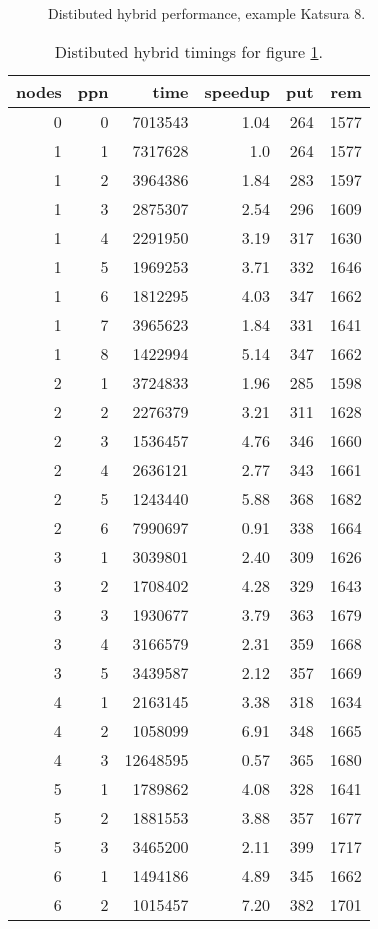 \documentclass[10pt,twocolumn,a4paper]{article}
\begin{document}
\begin{figure}[thb]
\centering
{}
\caption{Distibuted hybrid performance, example Katsura 8.}
\label{fig:k8hyb1}
\end{figure}

\begin{table}[thb]
\centering
\caption{Distibuted hybrid timings for figure \ref{fig:k8hyb1}.}
\label{fig:k8hyb1t}
\small{
\clearpage{}
\begin{tabular}{|r|r|r|r|r|r|}
\hline
 nodes & ppn & time & speedup & put & rem 
\\ \hline
 0 & 0 & 7013543 & 1.04 & 264 & 1577
\\ \hline
 1 & 1 & 7317628 & 1.0 & 264 & 1577
\\ \hline
 1 & 2 & 3964386 & 1.84 & 283 & 1597
\\ \hline
 1 & 3 & 2875307 & 2.54 & 296 & 1609
\\ \hline
 1 & 4 & 2291950 & 3.19 & 317 & 1630
\\ \hline
 1 & 5 & 1969253 & 3.71 & 332 & 1646
\\ \hline
 1 & 6 & 1812295 & 4.03 & 347 & 1662
\\ \hline
 1 & 7 & 3965623 & 1.84 & 331 & 1641
\\ \hline
 1 & 8 & 1422994 & 5.14 & 347 & 1662
\\ \hline
 2 & 1 & 3724833 & 1.96 & 285 & 1598
\\ \hline
 2 & 2 & 2276379 & 3.21 & 311 & 1628
\\ \hline
 2 & 3 & 1536457 & 4.76 & 346 & 1660
\\ \hline
 2 & 4 & 2636121 & 2.77 & 343 & 1661
\\ \hline
 2 & 5 & 1243440 & 5.88 & 368 & 1682
\\ \hline
 2 & 6 & 7990697 & 0.91 & 338 & 1664
\\ \hline
 3 & 1 & 3039801 & 2.40 & 309 & 1626
\\ \hline
 3 & 2 & 1708402 & 4.28 & 329 & 1643
\\ \hline
 3 & 3 & 1930677 & 3.79 & 363 & 1679
\\ \hline
 3 & 4 & 3166579 & 2.31 & 359 & 1668
\\ \hline
 3 & 5 & 3439587 & 2.12 & 357 & 1669
\\ \hline
 4 & 1 & 2163145 & 3.38 & 318 & 1634
\\ \hline
 4 & 2 & 1058099 & 6.91 & 348 & 1665
\\ \hline
 4 & 3 & 12648595 & 0.57 & 365 & 1680
\\ \hline
 5 & 1 & 1789862 & 4.08 & 328 & 1641
\\ \hline
 5 & 2 & 1881553 & 3.88 & 357 & 1677
\\ \hline
 5 & 3 & 3465200 & 2.11 & 399 & 1717
\\ \hline
 6 & 1 & 1494186 & 4.89 & 345 & 1662
\\ \hline
 6 & 2 & 1015457 & 7.20 & 382 & 1701
\\ \hline
\end{tabular}
\clearpage{}
}
\end{table}
\end{document}
